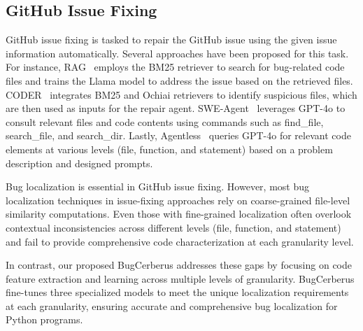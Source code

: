 \subsection{GitHub Issue Fixing}
GitHub issue fixing is tasked to repair the GitHub issue using the given issue information automatically. Several approaches have been proposed for this task. For instance, RAG~\cite{jimenez2024swebench} employs the BM25 retriever to search for bug-related code files and trains the Llama model to address the issue based on the retrieved files. 
CODER~\cite{chen2024coder} integrates BM25 and Ochiai retrievers to identify suspicious files, which are then used as inputs for the repair agent. 
SWE-Agent~\cite{yang2024sweagent} leverages GPT-4o to consult relevant files and code contents using commands such as find\_file, search\_file, and search\_dir. 
Lastly, Agentless~\cite{agentless} queries GPT-4o for relevant code elements at various levels (file, function, and statement) based on a problem description and designed prompts.

Bug localization is essential in GitHub issue fixing. However, most bug localization techniques in issue-fixing approaches rely on coarse-grained file-level similarity computations. Even those with fine-grained localization often overlook contextual inconsistencies across different levels (file, function, and statement) and fail to provide comprehensive code characterization at each granularity level.

In contrast, our proposed BugCerberus addresses these gaps by focusing on code feature extraction and learning across multiple levels of granularity. BugCerberus fine-tunes three specialized models to meet the unique localization requirements at each granularity, ensuring accurate and comprehensive bug localization for Python programs.
